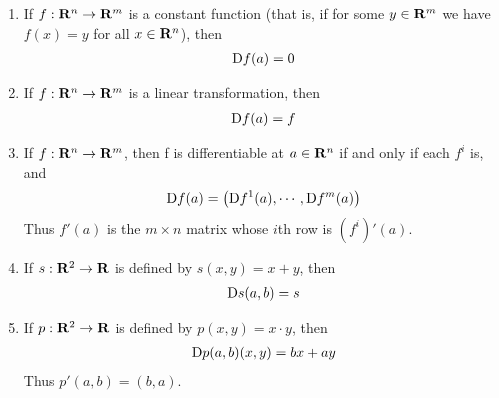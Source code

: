 \begin{theorem}
    \begin{enumerate}[label={\upshape(\arabic*)}]
        \item If $f:\mathbf{R}^n\to \mathbf{R}^m$ is a constant function (that is, if for some
            $y \in \mathbf{R}^m$ we have $f(x) = y$ for all $x \in \mathbf{R}^n$), then
            \begin{align*}
                \mathrm{D}f(a) = 0
            \end{align*} 
        \item If $f:\mathbf{R}^n\to \mathbf{R}^m$ is a linear transformation, then
            \begin{align*}
                \mathrm{D}f(a) = f
            \end{align*}
        \item If $f:\mathbf{R}^n\to \mathbf{R}^m$, then f is differentiable at $a\in \mathbf{R}^n$ if and only if 
            each $f^i$ is, and 
            \begin{align*}
                \mathrm{D}f(a) = \left(\mathrm{D}f^1(a), \cdots, \mathrm{D}f^m(a)\right)
            \end{align*}
            Thus $f'(a)$ is the $m\times n$ matrix whose $i$th row is $\left(f^i\right)'(a)$.
        \item If $s:\mathbf{R}^2\to \mathbf{R}$ is defined by $s(x, y) = x+y$, then 
            \begin{align*}
                \mathrm{D}s(a, b) = s
            \end{align*}
        \item If $p:\mathbf{R}^2\to \mathbf{R}$ is defined by $p(x, y) = x\cdot y$, then 
            \begin{align*}
                \mathrm{D}p(a, b)(x, y) = bx + ay
            \end{align*}
            Thus $p'(a, b) = (b, a)$.
    \end{enumerate}
\end{theorem}

